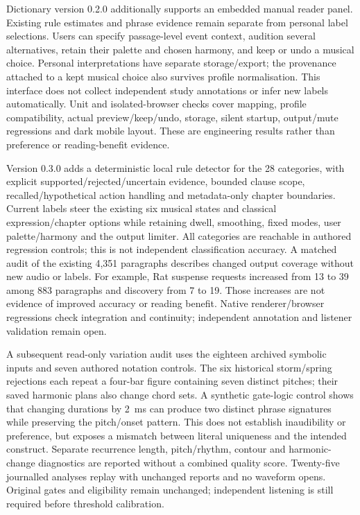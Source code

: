 \documentclass[11pt]{article}
\begin{document}
Dictionary version 0.2.0 additionally supports an embedded manual reader panel. Existing rule estimates and phrase evidence remain separate from personal label selections. Users can specify passage-level event context, audition several alternatives, retain their palette and chosen harmony, and keep or undo a musical choice. Personal interpretations have separate storage/export; the provenance attached to a kept musical choice also survives profile normalisation. This interface does not collect independent study annotations or infer new labels automatically. Unit and isolated-browser checks cover mapping, profile compatibility, actual preview/keep/undo, storage, silent startup, output/mute regressions and dark mobile layout. These are engineering results rather than preference or reading-benefit evidence.

Version 0.3.0 adds a deterministic local rule detector for the 28 categories, with explicit supported/rejected/uncertain evidence, bounded clause scope, recalled/hypothetical action handling and metadata-only chapter boundaries. Current labels steer the existing six musical states and classical expression/chapter options while retaining dwell, smoothing, fixed modes, user palette/harmony and the output limiter. All categories are reachable in authored regression controls; this is not independent classification accuracy. A matched audit of the existing 4,351 paragraphs describes changed output coverage without new audio or labels. For example, Rat suspense requests increased from 13 to 39 among 883 paragraphs and discovery from 7 to 19. Those increases are not evidence of improved accuracy or reading benefit. Native renderer/browser regressions check integration and continuity; independent annotation and listener validation remain open.

A subsequent read-only variation audit uses the eighteen archived symbolic inputs and seven authored notation controls. The six historical storm/spring rejections each repeat a four-bar figure containing seven distinct pitches; their saved harmonic plans also change chord sets. A synthetic gate-logic control shows that changing durations by 2~ms can produce two distinct phrase signatures while preserving the pitch/onset pattern. This does not establish inaudibility or preference, but exposes a mismatch between literal uniqueness and the intended construct. Separate recurrence length, pitch/rhythm, contour and harmonic-change diagnostics are reported without a combined quality score. Twenty-five journalled analyses replay with unchanged reports and no waveform opens. Original gates and eligibility remain unchanged; independent listening is still required before threshold calibration.
\end{document}
